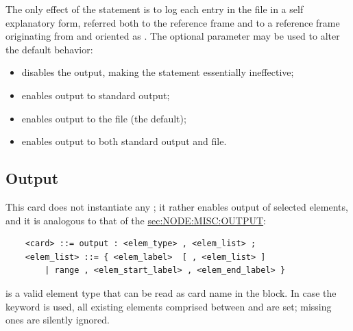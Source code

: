 \noindent
The only effect of the  statement is to log
each  entry in the  file in a self explanatory form,
referred both to the  reference frame and to a reference frame
originating from  and oriented 
as .
The optional parameter  may be used to alter the default 
behavior:
\begin{itemize}
\item {} disables the output, making the  
statement essentially ineffective;
\item {} enables output to standard output;
\item {} enables output to the  file (the default);
\item {} enables output to both standard output and  file.
\end{itemize}



\subsection{Output}\label{sec:EL:MISC:OUTPUT}
This card does not instantiate any ; it rather enables
output of selected elements, and it is analogous to that of the
\hyperref{\kw{nodes}}{\kw{nodes} (see Section~}{)}{sec:NODE:MISC:OUTPUT}:
\begin{verbatim}
    <card> ::= output : <elem_type> , <elem_list> ;
    <elem_list> ::= { <elem_label>  [ , <elem_list> ]
        | range , <elem_start_label> , <elem_end_label> }
\end{verbatim}
 is a valid element type that can be read 
as card name in the  block.
In case the keyword  is used, all existing elements comprised
between  and 
are set; missing ones are silently ignored.





